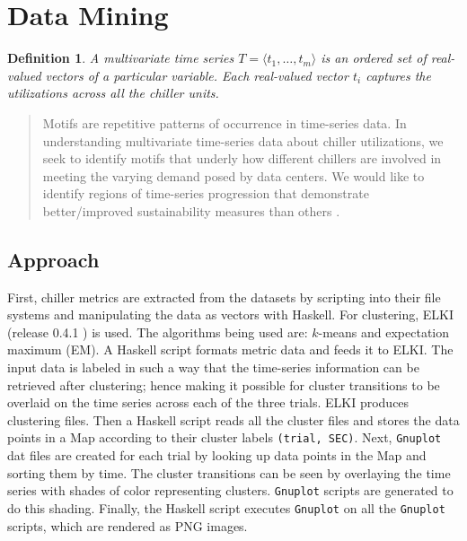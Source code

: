  \section*{Data Mining}
\newtheorem{mydef}{Definition}


\begin{mydef} 
   A multivariate time series $T = \langle t_1,\dots, t_m\rangle$ is an ordered set of real-valued vectors of a particular variable. Each real-valued vector $t_i$ captures the utilizations across all the chiller units.
 \end{mydef}

     \begin{quote}
Motifs are repetitive patterns of occurrence in time-series data. In understanding multivariate time-series data about chiller utilizations, we seek to identify motifs that underly how different chillers are involved in meeting the varying demand posed by data centers. We would like to identify regions of time-series progression that demonstrate better/improved sustainability measures than others
   \cite[p. :7]{Patnaik2011}.\end{quote}


 \subsection*{Approach}
First, chiller metrics are extracted from the datasets by scripting into their file systems and manipulating the data as vectors with Haskell.
For clustering, ELKI (release 0.4.1 \cite{Achtert}) is used. The algorithms being used are: $k$-means and expectation maximum (EM). 
A Haskell script formats metric data and feeds it to ELKI.
The input data is labeled in such a way that the time-series information can be retrieved after clustering; hence making it possible for cluster transitions to be overlaid on the time series across each of the three trials.
ELKI produces clustering files. Then a Haskell script reads all the cluster files and stores the data points in a Map according to their cluster labels {\tt (trial, SEC)}. Next, {\tt Gnuplot} dat files are created for each trial by looking up data points in the Map and sorting them by time.
The cluster transitions can be seen by overlaying the time series with shades of color representing clusters. 
{\tt Gnuplot} scripts are generated to do this shading. Finally, the Haskell script executes {\tt Gnuplot} on all the {\tt Gnuplot} scripts, which are rendered as PNG images.

